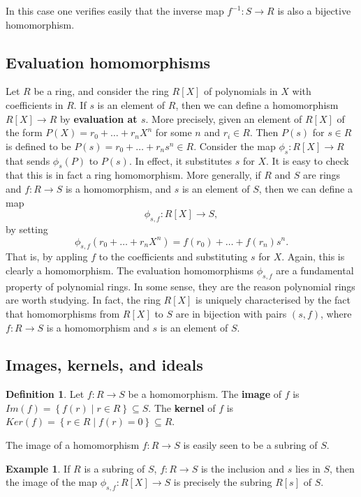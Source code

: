 \documentclass{article}
\newcommand{\rb}[1]{\left( #1 \right)}
\renewcommand{\sb}[1]{\left[ #1 \right]}
\newcommand{\cb}[1]{\left\{ #1 \right\}}
\theoremstyle{definition}\newtheorem{definition}{Definition}[subsection]
\theoremstyle{definition}\newtheorem{remark}[definition]{Remark}
\theoremstyle{definition}\newtheorem*{example}{Example}
\theoremstyle{definition}\newtheorem*{note}{Note}
\begin{document}
In this case one verifies easily that the inverse map $ f^{-1} : S \to R $ is also a bijective homomorphism.

\subsection{Evaluation homomorphisms}

Let $ R $ be a ring, and consider the ring $ R\sb{X} $ of polynomials in $ X $ with coefficients in $ R $. If $ s $ is an element of $ R $, then we can define a homomorphism $ R\sb{X} \to R $ by \textbf{evaluation at $ s $}. More precisely, given an element of $ R\sb{X} $ of the form $ P\rb{X} = r_0 + \dots + r_nX^n $ for some $ n $ and $ r_i \in R $. Then $ P\rb{s} $ for $ s \in R $ is defined to be $ P\rb{s} = r_0 + \dots + r_ns^n \in R $. Consider the map $ \phi_s : R\sb{X} \to R $ that sends $ \phi_s\rb{P} $ to $ P\rb{s} $. In effect, it substitutes $ s $ for $ X $. It is easy to check that this is in fact a ring homomorphism. More generally, if $ R $ and $ S $ are rings and $ f : R \to S $ is a homomorphism, and $ s $ is an element of $ S $, then we can define a map
$$ \phi_{s, f} : R\sb{X} \to S, $$
by setting
$$ \phi_{s, f}\rb{r_0 + \dots + r_nX^n} = f\rb{r_0} + \dots + f\rb{r_n}s^n. $$
That is, by appling $ f $ to the coefficients and substituting $ s $ for $ X $. Again, this is clearly a homomorphism. The evaluation homomorphisms $ \phi_{s, f} $ are a fundamental property of polynomial rings. In some sense, they are the reason polynomial rings are worth studying. In fact, the ring $ R\sb{X} $ is uniquely characterised by the fact that homomorphisms from $ R\sb{X} $ to $ S $ are in bijection with pairs $ \rb{s, f} $, where $ f : R \to S $ is a homomorphism and $ s $ is an element of $ S $.

\subsection{Images, kernels, and ideals}

\begin{definition}
Let $ f : R \to S $ be a homomorphism. The \textbf{image} of $ f $ is $ Im\rb{f} = \cb{f\rb{r} \mid r \in R} \subseteq S $. The \textbf{kernel} of $ f $ is $ Ker\rb{f} = \cb{r \in R \mid f\rb{r} = 0} \subseteq R $.
\end{definition}

The image of a homomorphism $ f : R \to S $ is easily seen to be a subring of $ S $.

\begin{example}
If $ R $ is a subring of $ S $, $ f : R \to S $ is the inclusion and $ s $ lies in $ S $, then the image of the map $ \phi_{s, f} : R\sb{X} \to S $ is precisely the subring $ R\sb{s} $ of $ S $.
\end{example}
\end{document}
